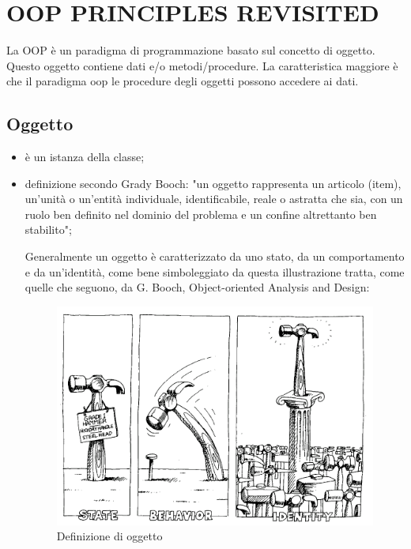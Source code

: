 \section{OOP PRINCIPLES REVISITED}

La OOP è un paradigma di programmazione basato sul concetto di oggetto. Questo oggetto contiene dati e/o metodi/procedure. La caratteristica maggiore è che il paradigma oop le procedure degli oggetti possono accedere ai dati.


\subsection{Oggetto}

\begin{itemize}
\item è un istanza della classe;
\item definizione secondo Grady Booch: "un oggetto rappresenta un articolo (item), un'unità o un'entità individuale, identificabile, reale o astratta che sia, con un ruolo ben definito nel dominio del problema e un confine altrettanto ben stabilito";

Generalmente un oggetto è caratterizzato da uno stato, da un comportamento e da un'identità, come bene simboleggiato da questa illustrazione tratta, come quelle che seguono, da G. Booch, Object-oriented Analysis and Design:

\begin{figure}[H]
\includegraphics[scale=0.4]{images/oggetto}
\caption{Definizione di oggetto  \label{fig:oggetto}}
\end{figure}
\end{itemize} 


